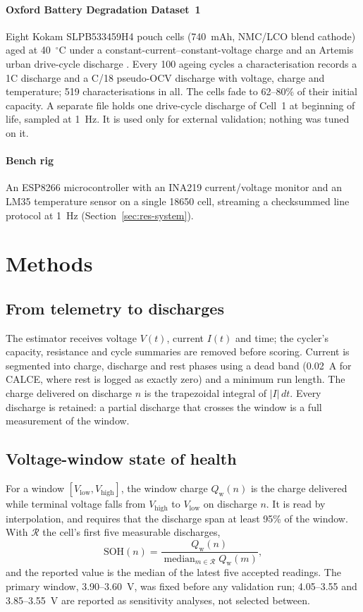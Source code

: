 \documentclass[preprint,12pt,authoryear]{elsarticle}
\newcommand{\SOH}{\mathrm{SOH}}
\newcommand{\Qw}{Q_{\mathrm{w}}}
\begin{document}
\paragraph{Oxford Battery Degradation Dataset~1}
Eight Kokam SLPB533459H4 pouch cells (740~mAh, NMC/LCO blend cathode) aged at
40~$^\circ$C under a constant-current--constant-voltage charge and an Artemis
urban drive-cycle discharge \citep{howey2017oxford,birkl2017thesis}. Every 100
ageing cycles a characterisation records a 1C discharge and a C/18 pseudo-OCV
discharge with voltage, charge and temperature; 519 characterisations in all.
The cells fade to 62--80\% of their initial capacity. A separate file holds one
drive-cycle discharge of Cell~1 at beginning of life, sampled at 1~Hz. It is
used only for external validation; nothing was tuned on it.

\paragraph{Bench rig}
An ESP8266 microcontroller with an INA219 current/voltage monitor and an LM35
temperature sensor on a single 18650 cell, streaming a checksummed line
protocol at 1~Hz (Section~\ref{sec:res-system}).

\section{Methods}
\label{sec:methods}

\subsection{From telemetry to discharges}
The estimator receives voltage $V(t)$, current $I(t)$ and time; the cycler's
capacity, resistance and cycle summaries are removed before scoring. Current is
segmented into charge, discharge and rest phases using a dead band (0.02~A for
CALCE, where rest is logged as exactly zero) and a minimum run length. The
charge delivered on discharge $n$ is the trapezoidal integral of $|I|\,dt$.
Every discharge is retained: a partial discharge that crosses the window is a
full measurement of the window.

\subsection{Voltage-window state of health}
For a window $[V_\mathrm{low}, V_\mathrm{high}]$, the window charge
$\Qw(n)$ is the charge delivered while terminal voltage falls from
$V_\mathrm{high}$ to $V_\mathrm{low}$ on discharge $n$. It is read by
interpolation, and requires that the discharge span at least 95\% of the
window. With $\mathcal{R}$ the cell's first five measurable discharges,
\begin{equation}
\SOH(n) = \frac{\Qw(n)}{\operatorname{median}_{m\in\mathcal{R}} \Qw(m)} ,
\label{eq:soh}
\end{equation}
and the reported value is the median of the latest five accepted readings. The
primary window, 3.90--3.60~V, was fixed before any validation run;
4.05--3.55 and 3.85--3.55~V are reported as sensitivity analyses, not
selected between.
\end{document}

